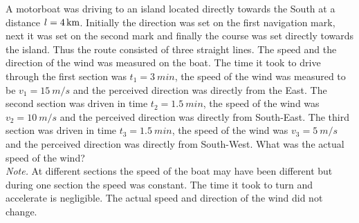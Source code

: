 \documentclass[11pt]{article}
\begin{document}

\probeng
A motorboat was driving to an island located directly towards the South at a distance $l=\SI 4{km}$. Initially the direction was set on the first navigation mark, next it was set on the second mark and finally the course was set directly towards the island. Thus the route consisted of three straight lines. The speed and the direction of the wind was measured on the boat. The time it took to drive through the first section was $t_1=\SI{3}{min}$, the speed of the wind was measured to be $v_1=\SI{15}{m/s}$ and the perceived direction was directly from the East. The second section was driven in time $t_2=\SI{1,5}{min}$, the speed of the wind was $v_2=\SI{10}{m/s}$ and the perceived direction was directly from South-East. The third section was driven in time $t_3=\SI{1,5}{min}$, the speed of the wind was $v_3=\SI{5}{m/s}$ and the perceived direction was directly from South-West. What was the actual speed of the wind?\\
\emph{Note.} At different sections the speed of the boat may have been different but during one section the speed was constant. The time it took to turn and accelerate is negligible. The actual speed and direction of the wind did not change.
\probend
\bigskip
\newpage\subsection{\protect{}}

\end{document}
